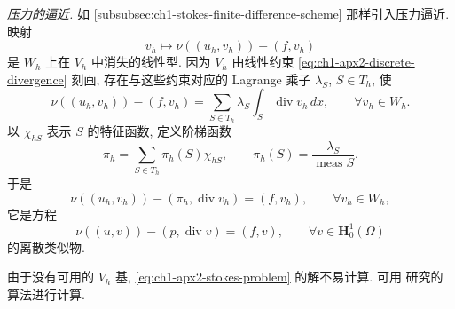 \emph{压力的逼近.} 如 \ref{subsubsec:ch1-stokes-finite-difference-scheme} 那样引入压力逼近. 映射
\[
v_h\longmapsto\nu((u_h,v_h))-(f,v_h)
\]
是 $W_h$ 上在 $V_h$ 中消失的线性型. 因为 $V_h$ 由线性约束 \eqref{eq:ch1-apx2-discrete-divergence} 刻画, 存在与这些约束对应的 Lagrange 乘子 $\lambda_S$, $S\in T_h$, 使
\begin{equation}
\nu((u_h,v_h))-(f,v_h)
=\sum_{S\in T_h}\lambda_S\int_S\operatorname{div}v_h\,dx,
\qquad\forall v_h\in W_h.
\label{eq:ch1-apx2-pressure-multipliers}
\end{equation}
以 $\chi_{hS}$ 表示 $S$ 的特征函数, 定义阶梯函数
\begin{equation}
\pi_h=\sum_{S\in T_h}\pi_h(S)\chi_{hS},
\qquad
\pi_h(S)=\frac{\lambda_S}{\operatorname{meas}S}.
\label{eq:ch1-apx2-discrete-pressure}
\end{equation}
于是
\begin{equation}
\nu((u_h,v_h))-(\pi_h,\operatorname{div}v_h)
=(f,v_h),\qquad\forall v_h\in W_h,
\label{eq:ch1-apx2-discrete-momentum}
\end{equation}
它是方程
\begin{equation}
\nu((u,v))-(p,\operatorname{div}v)
=(f,v),\qquad\forall v\in\mathbf H_0^1(\Omega)
\label{eq:ch1-continuous-stokes-weak-pressure}
\end{equation}
的离散类似物.

\begin{Remark}
\label{rem:ch1-apx2-computation}
由于没有可用的 $V_h$ 基, \eqref{eq:ch1-apx2-stokes-problem} 的解不易计算. 可用  研究的算法进行计算.
\end{Remark}

